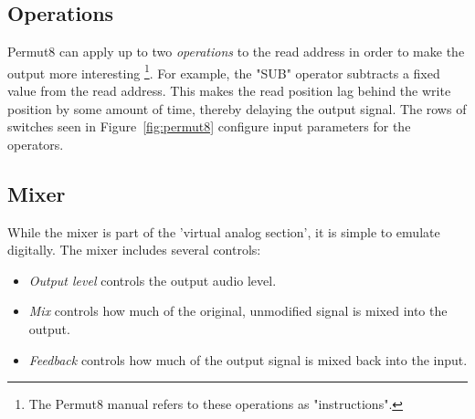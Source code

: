 \documentclass[12pt, letterpaper]{article}
\begin{document}
\subsection{Operations}
Permut8 can apply up to two \textit{operations} to the read address in order to make the output more interesting \footnote{The Permut8 manual refers to these operations as "instructions".}. For example, the "SUB" operator subtracts a fixed value from the read address. This makes the read position lag behind the write position by some amount of time, thereby delaying the output signal. The rows of switches seen in Figure~\ref{fig:permut8} configure input parameters for the operators.
\subsection{Mixer}
While the mixer is part of the 'virtual analog section', it is simple to emulate digitally. The mixer includes several controls:
\begin{itemize}
\item \textit{Output level} controls the output audio level.
\item \textit{Mix} controls how much of the original, unmodified signal is mixed into the output.
\item \textit{Feedback} controls how much of the output signal is mixed back into the input.
\end{itemize}
\end{document}
